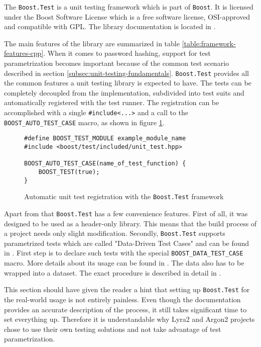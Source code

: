The \texttt{Boost.Test} is a unit testing framework which is part of \texttt{Boost}. It is licensed under the Boost Software License which is a free software license, OSI-approved and compatible with GPL. The library documentation is located in \cite{boost:2017:test-docs}.

The main features of the library are summarized in table \ref{table:framework-features-cpp}. When it comes to password hashing, support for test parametrization becomes important because of the common test scenario described in section \ref{subsec:unit-testing-fundamentals}. \texttt{Boost.Test} provides all the common features a unit testing library is expected to have. The tests can be completely decoupled from the implementation, subdivided  into test suits and automatically registered with the test runner. The registration can be accomplished with a single \texttt{#include<...>} and a call to the \texttt{BOOST_AUTO_TEST_CASE} macro, as shown in figure \ref{figure:boost-auto-test-case}.

\begin{figure}
\centering
\begin{verbatim}
#define BOOST_TEST_MODULE example_module_name
#include <boost/test/included/unit_test.hpp>

BOOST_AUTO_TEST_CASE(name_of_test_function) {
    BOOST_TEST(true);
}
  \end{verbatim}
  \caption{Automatic unit test registration with the \texttt{Boost.Test} framework}
  \label{figure:boost-auto-test-case}
  \end{figure}

Apart from that \texttt{Boost.Test} has a few convenience features. First of all, it was designed to be used as a header-only library. This means that the build process of a project needs only slight modification. Secondly, \texttt{Boost.Test} supports parametrized tests which are called "Data-Driven Test Cases" and can be found in \cite{boost:2017:test-data-driven}. First step is to declare such tests with the special \texttt{BOOST_DATA_TEST_CASE} macro. More details about its usage can be found in \cite{boost:2017:test-docs-data-macro}. The data also has to be wrapped into a dataset. The exact procedure is described in detail in \cite{boost:2017:test-docs-dataset}.

This section should have given the reader a hint that setting up \texttt{Boost.Test} for the real-world usage is not entirely painless. Even though the documentation provides an accurate description of the process, it still takes significant time to set everything up. Therefore it is understandable why Lyra2 and Argon2 projects chose to use their own testing solutions and not take advantage of test parametrization.

